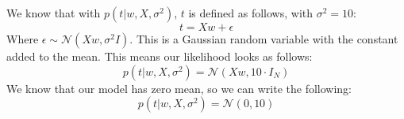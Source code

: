 We know that with $p(t|w,X,\sigma^2)$, $t$ is defined as follows, with $\sigma^2 = 10$:
$$
t = Xw + \epsilon
$$
Where $\epsilon \sim \mathcal{N}(Xw, \sigma^2I)$. This is a Gaussian random variable with the constant added to the mean. This means our likelihood looks as follows:
$$
p(t|w,X,\sigma^2) = \mathcal{N}(Xw,10 \cdot I_N)
$$
We know that our model has zero mean, so we can write the following:
$$
p(t|w,X,\sigma^2) = \mathcal{N}(0,10)
$$